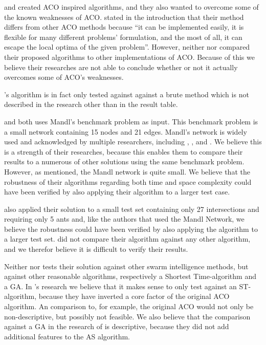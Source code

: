 \citet{hsiao04} and \citet{sedighpour14} created ACO inspired algorithms, and they also wanted to overcome some of the known weaknesses of ACO. \citet{hsiao04} stated in the introduction that their method differs from other ACO methods because ``it can be implemented easily, it is flexible for many different problems' formulation, and the most of all, it can escape the local optima of the given problem''. However, neither \citet{hsiao04} nor \citet{sedighpour14} compared their proposed algorithms to other implementations of ACO. Because of this we believe their researches are not able to conclude whether or not it actually overcomes some of ACO's weaknesses. 

\citet{hsiao04}'s algorithm is in fact only tested against against a brute method which is not described in the research other than in the result table. 

\citet{nikolic14} and \citet{kechagiopoulos14} both uses Mandl's benchmark problem as input. This benchmark problem is a small network containing 15 nodes and 21 edges.  Mandl's network is widely used and acknowledged by multiple researchers, including \citet{nikolic14}, \citet{kechagiopoulos14}, and \citet{fan09}. We believe this is a strength of their researches, because this enables them to compare their results to a numerous of other solutions using the same benchmark problem. However, as mentioned, the Mandl network is quite small. We believe that the robustness of their algorithms regarding both time and space complexity could have been verified by also applying their algorithm to a larger test case. 

\citet{salehi-nezhad07} also applied their solution to a small test set containing only 27 intersections and requiring only 5 ants and, like the authors that used the Mandl Network, we believe the robustness could have been verified by also applying the algorithm to a larger test set. \citet{salehi-nezhad07} did not compare their algorithm against any other algorithm, and we therefor believe it is difficult to verify their results. 

Neither \citet{dias14} nor \citet{poorzahedy11} tests their solution against other swarm intelligence methods, but against other reasonable algorithms, respectively a Shortest Time-algorithm and a GA. In \citet{dias14}'s research we believe that it makes sense to only test against an ST-algorithm, because they have inverted a core factor of the original ACO algorithm. An comparison to, for example, the original ACO would not only be non-descriptive, but possibly not feasible. We also believe that the comparison against a GA in the research of \citet{poorzahedy11} is descriptive, because they did not add additional features to the AS algorithm. \newline

